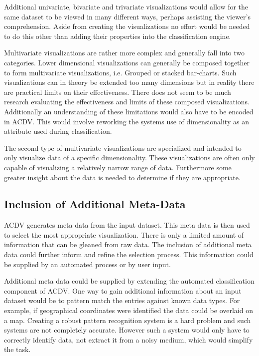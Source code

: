 \documentclass[a4paper, 11pt, titlepage, onehalfspacing]{report}
\begin{document}
Additional univariate, bivariate and trivariate visualizations would allow for the same dataset to be viewed in many different ways, perhaps assisting the viewer's comprehension. Aside from creating the visualizations no effort would be needed to do this other than adding their properties into the classification engine.

Multivariate visualizations are rather more complex and generally fall into two categories. Lower dimensional visualizations can generally be composed together to form multivariate visualizations, i.e. Grouped or stacked bar-charts. Such visualizations can in theory be extended too many dimensions but in reality there are practical limits on their effectiveness. There does not seem to be much research evaluating the effectiveness and limits of these composed visualizations. Additionally an understanding of these limitations would also have to be encoded in AC\lightning{}DV. This would involve reworking the systems use of dimensionality as an attribute used during classification.

The second type of multivariate visualizations are specialized and intended to only visualize data of a specific dimensionality. These visualizations are often only capable of visualizing a relatively narrow range of data. Furthermore some greater insight about the data is needed to determine if they are appropriate.

\subsection{Inclusion of Additional Meta-Data}
AC\lightning{}DV generates meta data from the input dataset. This meta data is then used to select the most appropriate visualization. There is only a limited amount of information that can be gleaned from raw data. The inclusion of additional meta data could further inform and refine the selection process. This information could be supplied by an automated process or by user input.

Additional meta data could be supplied by extending the automated classification component of AC\lightning{}DV. One way to gain additional information about an input dataset would be to pattern match the entries against known data types. For example, if geographical coordinates were identified the data could be overlaid on a map. Creating a robust pattern recognition system is a hard problem and such systems are not completely accurate. However such a system would only have to correctly identify data, not extract it from a noisy medium, which would simplify the task.
\end{document}
